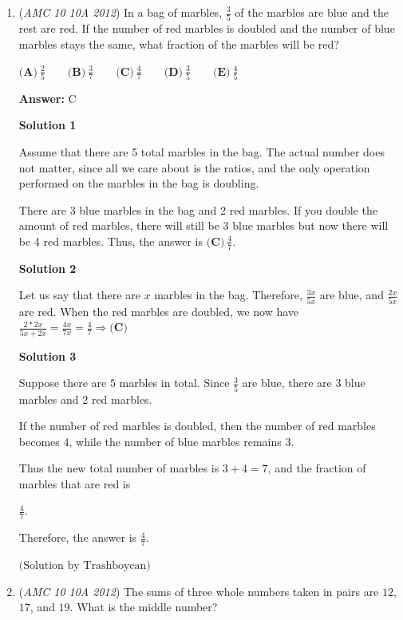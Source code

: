 \begin{enumerate}
 


	\item (\textit{AMC 10 10A 2012}) In a bag of marbles, $\frac{3}{5}$ of the marbles are blue and the rest are red. If the number of red marbles is doubled and the number of blue marbles stays the same, what fraction of the marbles will be red?


 $\textbf{(A)}\ \frac{2}{5}\qquad\textbf{(B)}\ \frac{3}{7}\qquad\textbf{(C)}\ \frac{4}{7}\qquad\textbf{(D)}\ \frac{3}{5}\qquad\textbf{(E)}\ \frac{4}{5}$

 \textbf{Answer: }C



\textbf{Solution 1}

Assume that there are 5 total marbles in the bag. The actual number does not matter, since all we care about is the ratios, and the only operation performed on the marbles in the bag is doubling.

 There are 3 blue marbles in the bag and 2 red marbles. If you double the amount of red marbles, there will still be 3 blue marbles but now there will be 4 red marbles. Thus, the answer is $\boxed{\textbf{(C)}\ \frac{4}{7}}$.

 



\textbf{Solution 2}

Let us say that there are $x$ marbles in the bag. Therefore, $\frac{3x}{5x}$ are blue, and $\frac{2x}{5x}$ are red. When the red marbles are doubled, we now have $\frac{2*2x}{5x+2x} = \frac{4x}{7x} = \frac{4}{7} \Rightarrow \boxed{\textbf{(C)}}$




\textbf{Solution 3}

Suppose there are $5$ marbles in total. Since $\frac{3}{5}$ are blue, there are $3$ blue marbles and $2$ red marbles.

 If the number of red marbles is doubled, then the number of red marbles becomes $4$, while the number of blue marbles remains $3$.

 Thus the new total number of marbles is $3+4=7$, and the fraction of marbles that are red is

 $\frac{4}{7}$.

 Therefore, the answer is $\boxed{\frac{4}{7}}$.

 $\text{(Solution by Trashboycan)}$



	\item (\textit{AMC 10 10A 2012}) The sums of three whole numbers taken in pairs are $12$, $17$, and $19$. What is the middle number?



\end{enumerate}
